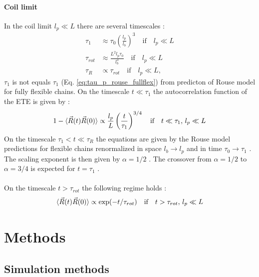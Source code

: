 \documentclass[
    paper=A4,pagesize=automedia,fontsize=12pt,
    BCOR=15mm,DIV=22,
    twoside,headinclude,footinclude=false,
    fleqn,             %
    bibliography=totocnumbered,          %
    listof=totoc,                %
    listof=flat,                 %
    cleardoublepage=empty      %
    numbers=endperiod
]{scrartcl}
\begin{document}
\paragraph{Coil limit}
In the coil limit $l_p \ll L$ there are several timescales \cite{Nikoubashman2016}:
\begin{equation}
    \begin{split}
        \tau_1 & \approx \tau_0 \left(\frac{l_p}{l_b}\right)^3 \quad \text{if} \quad l_p \ll L\\ 
        \tau_{rot} & \approx \frac{L^2 l_p \tau_0}{l_b^3} \quad \text{if} \quad l_p \ll L\\
        \tau_R & \propto \tau_{rot} \quad \text{if} \quad l_p \ll L \text{,}
    \end{split}
\end{equation}
$\tau_1$ is not equals $\tau_1$ (Eq. \ref{eq:tau_p_rouse_fullflex}) from predicton of Rouse model for fully flexible
chains.
On the timescale $t \ll \tau_1$ the autocorrelation function of the ETE is given by \cite{Nikoubashman2016}:
\begin{equation}
    1 - \langle\vec{R}(t)\vec{R}(0)\rangle \propto \frac{l_p}{L}\left(\frac{t}{\tau_1}\right)^{3/4} \quad \text{if} \quad t \ll \tau_1 \text{, } l_p \ll L
\end{equation}
On the timescale $\tau_1 < t \ll \tau_R$ the equations are given by the Rouse model
predictions for flexible chains renormalized in space $l_b \rightarrow l_p$ and in time
$\tau_0 \rightarrow \tau_1$ \cite{Nikoubashman2016}. The scaling exponent is then
given by $\alpha=1/2$ \cite{Nikoubashman2016}. The crossover from $\alpha=1/2$ to
$\alpha=3/4$ is expected for $t=\tau_1$ \cite{Nikoubashman2016}.
\\
\\
On the timescale $t > \tau_{rot}$ the following regime holds \cite{Nikoubashman2016}:
\begin{equation} \label{eq:autocorr_ete_coil_limit_long_time}
    \langle\vec{R}(t)\vec{R}(0)\rangle \propto \exp(-t/\tau_{rot}) \quad \text{if} \quad t > \tau_{rot} \text{, } l_p \ll L
\end{equation}

\section{Methods}
\subsection{Simulation methods}
\end{document}
